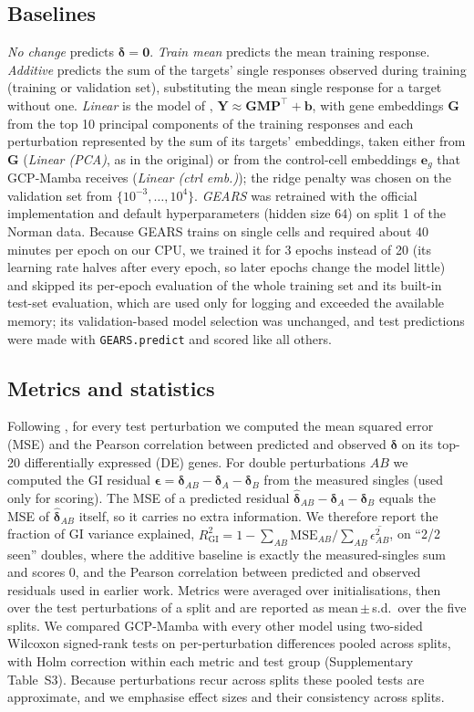 \documentclass{bioinfo}
\begin{document}
\subsection{Baselines}
\emph{No change} predicts $\bm{\delta}=\mathbf{0}$. \emph{Train mean} predicts the mean training
response. \emph{Additive} predicts the sum of the targets' single responses observed during training
(training or validation set), substituting the mean single response for a target without one.
\emph{Linear} is the model of \citet{ahlmann2025},
$\mathbf{Y}\approx\mathbf{G}\mathbf{M}\mathbf{P}^{\top}+\mathbf{b}$, with gene embeddings $\mathbf{G}$
from the top 10 principal components of the training responses and each perturbation represented by
the sum of its targets' embeddings, taken either from $\mathbf{G}$ (\emph{Linear (PCA)}, as in the
original) or from the control-cell embeddings $\mathbf{e}_g$ that GCP-Mamba receives
(\emph{Linear (ctrl emb.)}); the ridge penalty was chosen on the validation set from
$\{10^{-3},\dots,10^{4}\}$. \emph{GEARS} was retrained with the official implementation and default
hyperparameters (hidden size 64) on split 1 of the Norman data. Because GEARS trains on single cells
and required about 40 minutes per epoch on our CPU, we trained it for 3 epochs instead of 20 (its
learning rate halves after every epoch, so later epochs change the model little) and skipped its
per-epoch evaluation of the whole training set and its built-in test-set evaluation, which are used
only for logging and exceeded the available memory; its validation-based model selection was
unchanged, and test predictions were made with \texttt{GEARS.predict} and scored like all others.

\subsection{Metrics and statistics}
Following \citet{roohani2024}, for every test perturbation we computed the mean squared error (MSE)
and the Pearson correlation between predicted and observed $\bm\delta$ on its top-20 differentially
expressed (DE) genes. For double perturbations $AB$ we computed the GI residual
$\bm{\epsilon}=\bm{\delta}_{AB}-\bm{\delta}_{A}-\bm{\delta}_{B}$ from the measured singles (used only
for scoring). The MSE of a predicted residual $\hat{\bm\delta}_{AB}-\bm{\delta}_{A}-\bm{\delta}_{B}$
equals the MSE of $\hat{\bm\delta}_{AB}$ itself, so it carries no extra information. We therefore
report the fraction of GI variance explained,
$R^2_{\mathrm{GI}}=1-\sum_{AB}\mathrm{MSE}_{AB}\big/\sum_{AB}\overline{\epsilon^2_{AB}}$, on ``2/2
seen'' doubles, where the additive baseline is exactly the measured-singles sum and scores 0, and the
Pearson correlation between predicted and observed residuals used in earlier work. Metrics were
averaged over initialisations, then over the test perturbations of a split and are reported as mean\,$\pm$\,s.d.\ over the
five splits. We compared GCP-Mamba with every other model using two-sided Wilcoxon signed-rank tests
on per-perturbation differences pooled across splits, with Holm correction within each
metric and test group (Supplementary Table~S3). Because perturbations recur across splits these
pooled tests are approximate, and we emphasise effect sizes and their consistency across splits.
\end{document}
